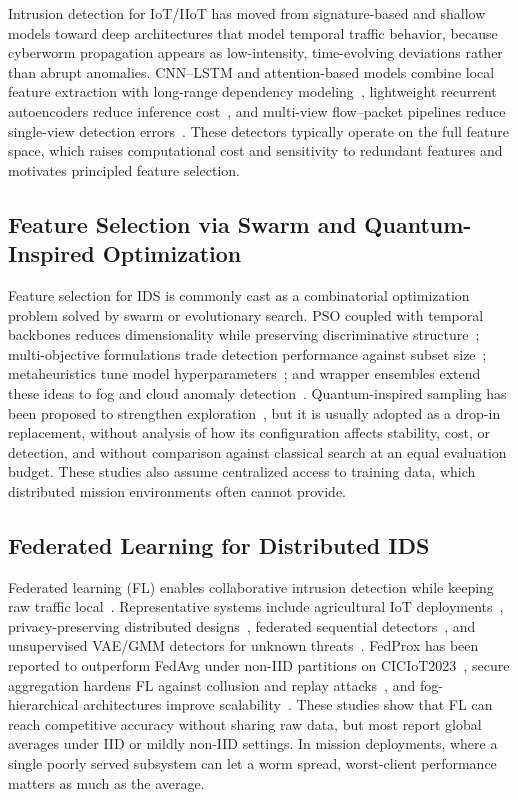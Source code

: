 \documentclass[conference]{IEEEtran}
\begin{document}
Intrusion detection for IoT/IIoT has moved from signature-based and
shallow models toward deep architectures that model temporal traffic
behavior, because cyberworm propagation appears as low-intensity,
time-evolving deviations rather than abrupt anomalies. CNN--LSTM and
attention-based models combine local feature extraction with
long-range dependency modeling~\cite{phalaagaehybrid,yuadaptive},
lightweight recurrent autoencoders reduce inference
cost~\cite{yupgtad}, and multi-view flow--packet pipelines reduce
single-view detection errors~\cite{sudyanaflow}. These detectors
typically operate on the full feature space, which raises
computational cost and sensitivity to redundant features and
motivates principled feature selection.

\subsection{Feature Selection via Swarm and Quantum-Inspired Optimization}

Feature selection for IDS is commonly cast as a combinatorial
optimization problem solved by swarm or evolutionary search.
PSO coupled with temporal backbones reduces dimensionality while
preserving discriminative structure~\cite{donkoloptimization};
multi-objective formulations trade detection performance against
subset size~\cite{sezginmulti,raeisientropy}; metaheuristics tune
model hyperparameters~\cite{kishoreimproved}; and wrapper ensembles
extend these ideas to fog and cloud anomaly
detection~\cite{yaseenefficient,bilalevaluation,maryenhancing,shrivashybrid}.
Quantum-inspired sampling has been proposed to strengthen
exploration~\cite{vivekquantum}, but it is usually adopted as a
drop-in replacement, without analysis of how its configuration affects
stability, cost, or detection, and without
comparison against classical search at an equal evaluation budget.
These studies also assume centralized access to training data, which
distributed mission environments often cannot provide.

\subsection{Federated Learning for Distributed IDS}

Federated learning (FL) enables collaborative intrusion detection
while keeping raw traffic local~\cite{hamadsystematic}.
Representative systems include agricultural IoT
deployments~\cite{FRIHA202217}, privacy-preserving distributed
designs~\cite{amrosecuring}, federated sequential
detectors~\cite{selvamfederated,anweradvanced}, and unsupervised
VAE/GMM detectors for unknown threats~\cite{camposfederated}. FedProx
has been reported to outperform FedAvg under non-IID partitions on
CICIoT2023~\cite{herlambangfederated}, secure aggregation hardens FL
against collusion and replay attacks~\cite{yaoenhanced}, and
fog-hierarchical architectures improve
scalability~\cite{alsalehheterogeneity,islamprivacy}. These studies
show that FL can reach competitive accuracy without sharing raw data,
but most report global averages under IID or mildly non-IID settings.
In mission deployments, where a single poorly served subsystem can
let a worm spread, worst-client performance matters as much as the
average.
\end{document}
